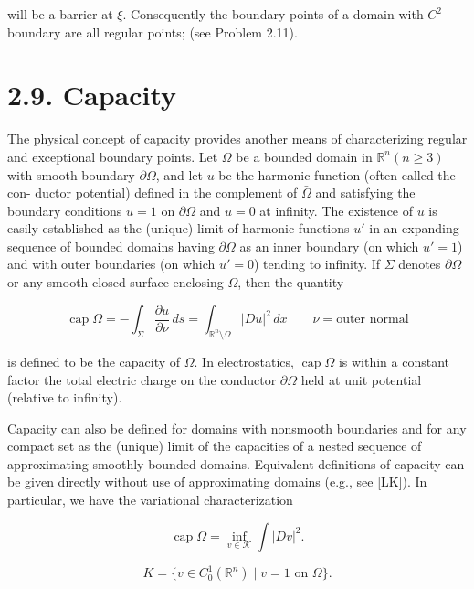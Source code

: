 will be a barrier at $\xi$. Consequently the boundary points of a domain with $C^2$
boundary are all regular points; (see Problem 2.11).

\section*{2.9. Capacity}

The physical concept of capacity provides another means of characterizing regular
and exceptional boundary points. Let $\Omega$ be a bounded domain in $\mathbb{R}^n(n \geq 3)$ with
smooth boundary $\partial\Omega$, and let $u$ be the harmonic function (often called the con-
ductor potential) defined in the complement of $\bar\Omega$ and satisfying the boundary
conditions $u=1$ on $\partial\Omega$ and $u=0$ at infinity. The existence of $u$ is easily established
as the (unique) limit of harmonic functions $u'$ in an expanding sequence of bounded
domains having $\partial\Omega$ as an inner boundary (on which $u' = 1$) and with outer
boundaries (on which $u' = 0$) tending to infinity. If $\Sigma$ denotes $\partial\Omega$ or any smooth
closed surface enclosing $\Omega$, then the quantity

\begin{equation}
\tag{2.35}
\operatorname{cap}\Omega = - \int_{\Sigma} \frac{\partial u}{\partial \nu}\, ds
= \int_{\mathbb{R}^n \setminus \Omega} |Du|^2\, dx
\qquad \nu = \text{outer normal}
\end{equation}

is defined to be the capacity of $\Omega$. In electrostatics, $\operatorname{cap}\Omega$ is within a constant factor
the total electric charge on the conductor $\partial\Omega$ held at unit potential (relative to
infinity).

Capacity can also be defined for domains with nonsmooth boundaries and for
any compact set as the (unique) limit of the capacities of a nested sequence of
approximating smoothly bounded domains. Equivalent definitions of capacity can
be given directly without use of approximating domains (e.g., see [LK]). In
particular, we have the variational characterization

\begin{equation}
\tag{2.36}
\operatorname{cap}\Omega = \inf_{v \in \mathcal{K}} \int |Dv|^2.
\end{equation}


\[
K = \{v \in C_0^1(\mathbb{R}^n)\mid v = 1 \text{ on } \Omega\}.
\]

